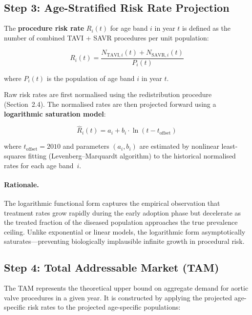 \documentclass[12pt, a4paper]{article}
\begin{document}
\subsection{Step 3: Age-Stratified Risk Rate Projection}

The \textbf{procedure risk rate} $R_i(t)$ for age band $i$ in year $t$ is defined as the number of combined TAVI + SAVR procedures per unit population:

\begin{equation}
    R_i(t) = \frac{N_{\mathrm{TAVI},i}(t) + N_{\mathrm{SAVR},i}(t)}{P_i(t)}
\end{equation}

\noindent where $P_i(t)$ is the population of age band $i$ in year $t$.

Raw risk rates are first normalised using the redistribution procedure (Section~2.4). The normalised rates are then projected forward using a \textbf{logarithmic saturation model}:

\begin{equation}
    \hat{R}_i(t) = a_i + b_i \cdot \ln(t - t_{\mathrm{offset}})
\end{equation}

\noindent where $t_{\mathrm{offset}} = 2010$ and parameters $(a_i, b_i)$ are estimated by nonlinear least-squares fitting (Levenberg--Marquardt algorithm) to the historical normalised rates for each age band~$i$.

\paragraph{Rationale.}
The logarithmic functional form captures the empirical observation that treatment rates grow rapidly during the early adoption phase but decelerate as the treated fraction of the diseased population approaches the true prevalence ceiling. Unlike exponential or linear models, the logarithmic form asymptotically saturates---preventing biologically implausible infinite growth in procedural risk.

\subsection{Step 4: Total Addressable Market (TAM)}

The TAM represents the theoretical upper bound on aggregate demand for aortic valve procedures in a given year. It is constructed by applying the projected age-specific risk rates to the projected age-specific populations:
\end{document}
